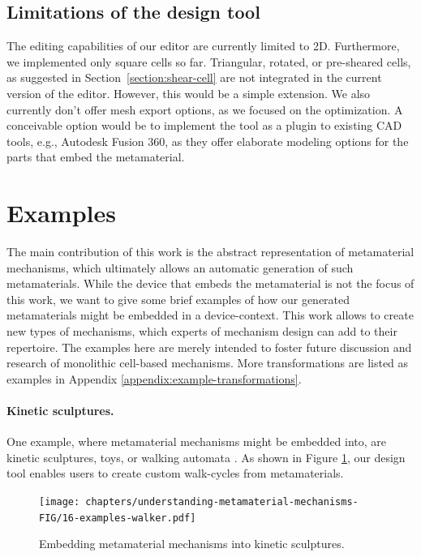 \subsection{Limitations of the design tool}

The editing capabilities of our editor are currently limited to 2D. Furthermore, we implemented only square cells so far. Triangular, rotated, or pre-sheared cells, as suggested in Section~\ref{section:shear-cell} are not integrated in the current version of the editor. However, this would be a simple extension.  We also currently don’t offer mesh export options, as we focused on the optimization. A conceivable option would be to implement the tool as a plugin to existing CAD tools, e.g., Autodesk Fusion 360, as they offer elaborate modeling options for the parts that embed the metamaterial.


\section{Examples}

The main contribution of this work is the abstract representation of metamaterial mechanisms, which ultimately allows an automatic generation of such metamaterials. While the device that embeds the metamaterial is not the focus of this work, we want to give some brief examples of how our generated metamaterials might be embedded in a device-context. This work allows to create new types of mechanisms, which experts of mechanism design can add to their repertoire. The examples here are merely intended to foster future discussion and research of monolithic cell-based mechanisms. More transformations are listed as examples in Appendix \ref{appendix:example-transformations}.

\paragraph{Kinetic sculptures.} One example, where metamaterial mechanisms might be embedded into, are kinetic sculptures, toys, or walking automata \cite{Thomaszewski2014}. As shown in Figure \ref{fig:16-examples-walker}, our design tool enables users to create custom walk-cycles from metamaterials. 

\begin{figure} [h!]
    \texttt{[image: chapters/understanding-metamaterial-mechanisms-FIG/16-examples-walker.pdf]}
    \caption[Short figure name.]{Embedding metamaterial mechanisms into kinetic sculptures. 
    \label{fig:16-examples-walker}}
\end{figure}

